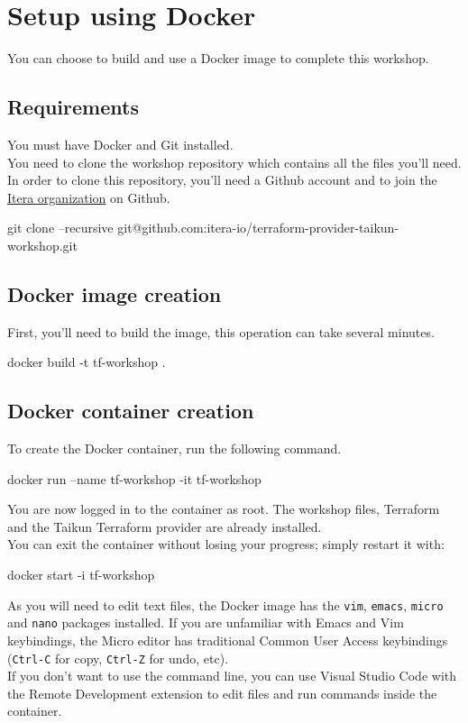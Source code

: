\section{Setup using Docker}\label{sec:docker}

You can choose to build and use a Docker image to complete this workshop.

\subsection{Requirements}

You must have Docker and Git installed.\\
You need to clone the workshop repository which contains all the files you'll need.\\
In order to clone this repository, you'll need a Github account and to join the \href{https://github.com/itera-io}{Itera organization} on Github.

\begin{shell}
git clone --recursive git@github.com:itera-io/terraform-provider-taikun-workshop.git
\end{shell}

\subsection{Docker image creation}

First, you'll need to build the image, this operation can take several minutes.

\begin{shell}
docker build -t tf-workshop .
\end{shell}

\subsection{Docker container creation}
To create the Docker container, run the following command.
\begin{shell}
docker run --name tf-workshop -it tf-workshop
\end{shell}
You are now logged in to the container as root. The workshop files,
Terraform and the Taikun Terraform provider are already installed.\\

You can exit the container without losing your progress; simply restart it with:
\begin{shell}
docker start -i tf-workshop
\end{shell}
As you will need to edit text files, the Docker image has the \texttt{vim},
\texttt{emacs}, \texttt{micro} and \texttt{nano} packages installed.
If you are unfamiliar with Emacs and Vim keybindings, the Micro editor
has traditional Common User Access keybindings (\texttt{Ctrl-C} for copy,
\texttt{Ctrl-Z} for undo, etc).\\

If you don't want to use the command line, you can use Visual Studio Code with
the Remote Development extension to edit files and run commands inside the
container.
